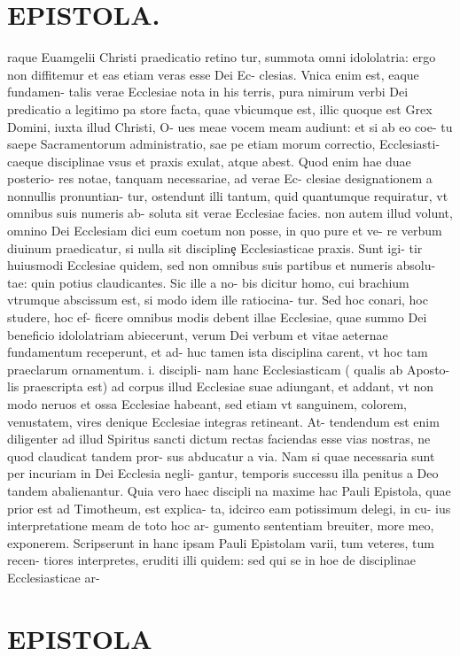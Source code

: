 \documentclass{article}
\begin{document}
\begin{pages}
\section*{EPISTOLA. }raque Euamgelii Christi praedicatio retino tur, summota omni idololatria: ergo non diffitemur et eas etiam veras esse Dei Ec- clesias. Vnica enim est, eaque fundamen- talis verae Ecclesiae nota in his terris, pura nimirum verbi Dei predicatio a legitimo pa store facta, quae vbicumque est, illic quoque est Grex Domini, iuxta illud Christi, O- ues meae vocem meam audiunt: et si ab eo coe- tu saepe Sacramentorum administratio, sae pe etiam morum correctio, Ecclesiasti- caeque disciplinae vsus et praxis exulat, atque abest. Quod enim hae duae posterio- res notae, tanquam necessariae, ad verae Ec- clesiae designationem a nonnullis pronuntian- tur, ostendunt illi tantum, quid quantumque requiratur, vt omnibus suis numeris ab- soluta sit verae Ecclesiae facies. non autem illud volunt, omnino Dei Ecclesiam dici eum coetum non posse, in quo pure et ve- re verbum diuinum praedicatur, si nulla sit disciplinȩ Ecclesiasticae praxis. Sunt igi- tir huiusmodi Ecclesiae quidem, sed non omnibus suis partibus et numeris absolu- tae: quin potius claudicantes. Sic ille a no- bis dicitur homo, cui brachium vtrumque abscissum est, si modo idem ille ratiocina- tur. Sed hoc conari, hoc studere, hoc ef- ficere omnibus modis debent illae Ecclesiae, quae summo Dei beneficio idololatriam abiecerunt, verum Dei verbum et vitae aeternae fundamentum receperunt, et ad- huc tamen ista disciplina carent, vt hoc tam praeclarum ornamentum. i. discipli- nam hanc Ecclesiasticam ( qualis ab Aposto- lis praescripta est) ad corpus illud Ecclesiae suae adiungant, et addant, vt non modo neruos et ossa Ecclesiae habeant, sed etiam vt sanguinem, colorem, venustatem, vires denique Ecclesiae integras retineant. At- tendendum est enim diligenter ad illud Spiritus sancti dictum rectas faciendas esse vias nostras, ne quod claudicat tandem pror- sus abducatur a via. Nam si quae necessaria sunt per incuriam in Dei Ecclesia negli- gantur, temporis successu illa penitus a Deo tandem abalienantur. Quia vero haec discipli na maxime hac Pauli Epistola, quae prior est ad Timotheum, est explica- ta, idcirco eam potissimum delegi, in cu- ius interpretatione meam de toto hoc ar- gumento sententiam breuiter, more meo, exponerem. Scripserunt in hanc ipsam Pauli Epistolam varii, tum veteres, tum recen- tiores interpretes, eruditi illi quidem: sed qui se in hoe de disciplinae Ecclesiasticae ar- 
\section*{EPISTOLA }

\end{pages}
\end{document}
